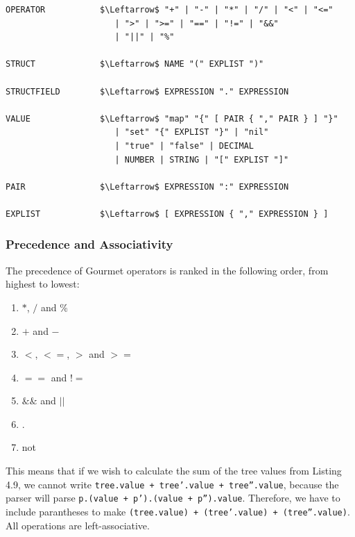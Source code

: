 \begin{lstlisting}[caption={Gourmet's grammar in EBNF notation.}, captionpos=b, label={The EBNF grammar of the Gourmet programming language.}]
OPERATOR           $\Leftarrow$ "+" | "-" | "*" | "/" | "<" | "<="
                      | ">" | ">=" | "==" | "!=" | "&&"
                      | "||" | "%"

STRUCT             $\Leftarrow$ NAME "(" EXPLIST ")"

STRUCTFIELD        $\Leftarrow$ EXPRESSION "." EXPRESSION

VALUE              $\Leftarrow$ "map" "{" [ PAIR { "," PAIR } ] "}"
                      | "set" "{" EXPLIST "}" | "nil"
                      | "true" | "false" | DECIMAL
                      | NUMBER | STRING | "[" EXPLIST "]"

PAIR               $\Leftarrow$ EXPRESSION ":" EXPRESSION

EXPLIST            $\Leftarrow$ [ EXPRESSION { "," EXPRESSION } ]
\end{lstlisting}


\subsubsection{Precedence and Associativity}

The precedence of Gourmet operators is ranked in the following order, from highest to lowest:

\begin{enumerate}
    \item $*$, $/$ and $\%$
    \item $+$ and $-$
    \item $<$, $<=$, $>$ and $>=$
    \item $==$ and $!=$
    \item $\&\&$ and $||$
    \item $.$
    \item not
\end{enumerate}

This means that if we wish to calculate the sum of the tree values from Listing 4.9, we cannot write \texttt{tree.value + tree'.value + tree''.value}, because the parser will parse \texttt{p.(value + p').(value + p'').value}. Therefore, we have to include parantheses to make \texttt{(tree.value) + (tree'.value) + (tree''.value)}. \\

All operations are left-associative.

